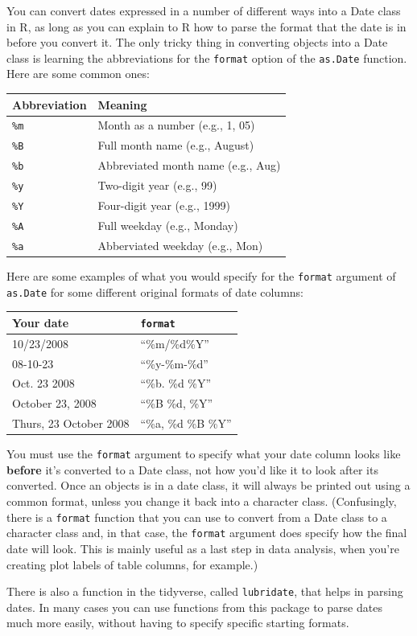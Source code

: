 \documentclass[]{book}
\makeatletter
\newenvironment{kframe}{%
\medskip{}
\setlength{\fboxsep}{.8em}
 \def\at@end@of@kframe{}%
 \ifinner\ifhmode%
  \def\at@end@of@kframe{\end{minipage}}%
  \begin{minipage}{\columnwidth}%
 \fi\fi%
 \def\FrameCommand##1{\hskip\@totalleftmargin \hskip-\fboxsep
 \colorbox{shadecolor}{##1}\hskip-\fboxsep
     \hskip-\linewidth \hskip-\@totalleftmargin \hskip\columnwidth}%
 \MakeFramed {\advance\hsize-\width
   \@totalleftmargin\z@ \linewidth\hsize
   \@setminipage}}%
 {\par\unskip\endMakeFramed%
 \at@end@of@kframe}
\newenvironment{rmdblock}[1]
  {
  \begin{itemize}
  \renewcommand{\labelitemi}{
    \raisebox{-.7\height}[0pt][0pt]{
      {\setkeys{Gin}{width=3em,keepaspectratio}\texttt{[image: images/\#1]}}
    }
  }
  \setlength{\fboxsep}{1em}
  \begin{kframe}
  \item
  }
  {
  \end{kframe}
  \end{itemize}
  }
\newenvironment{rmdwarning}
  {\begin{rmdblock}{warning}}
  {\end{rmdblock}}
\makeatother
\begin{document}
You can convert dates expressed in a number of different ways into a
Date class in R, as long as you can explain to R how to parse the format
that the date is in before you convert it. The only tricky thing in
converting objects into a Date class is learning the abbreviations for
the \texttt{format} option of the \texttt{as.Date} function. Here are
some common ones:

\begin{longtable}[c]{@{}ll@{}}
\toprule
Abbreviation & Meaning\tabularnewline
\midrule
\endhead
\texttt{\%m} & Month as a number (e.g., 1, 05)\tabularnewline
\texttt{\%B} & Full month name (e.g., August)\tabularnewline
\texttt{\%b} & Abbreviated month name (e.g., Aug)\tabularnewline
\texttt{\%y} & Two-digit year (e.g., 99)\tabularnewline
\texttt{\%Y} & Four-digit year (e.g., 1999)\tabularnewline
\texttt{\%A} & Full weekday (e.g., Monday)\tabularnewline
\texttt{\%a} & Abberviated weekday (e.g., Mon)\tabularnewline
\bottomrule
\end{longtable}

Here are some examples of what you would specify for the \texttt{format}
argument of \texttt{as.Date} for some different original formats of date
columns:

\begin{longtable}[c]{@{}ll@{}}
\toprule
Your date & \texttt{format}\tabularnewline
\midrule
\endhead
10/23/2008 & ``\%m/\%d\%Y''\tabularnewline
08-10-23 & ``\%y-\%m-\%d''\tabularnewline
Oct. 23 2008 & ``\%b. \%d \%Y''\tabularnewline
October 23, 2008 & ``\%B \%d, \%Y''\tabularnewline
Thurs, 23 October 2008 & ``\%a, \%d \%B \%Y''\tabularnewline
\bottomrule
\end{longtable}

\begin{rmdwarning}
You must use the \texttt{format} argument to specify what your date
column looks like \textbf{before} it's converted to a Date class, not
how you'd like it to look after its converted. Once an objects is in a
date class, it will always be printed out using a common format, unless
you change it back into a character class. (Confusingly, there is a
\texttt{format} function that you can use to convert from a Date class
to a character class and, in that case, the \texttt{format} argument
does specify how the final date will look. This is mainly useful as a
last step in data analysis, when you're creating plot labels of table
columns, for example.)
\end{rmdwarning}

There is also a function in the tidyverse, called \texttt{lubridate},
that helps in parsing dates. In many cases you can use functions from
this package to parse dates much more easily, without having to specify
specific starting formats.
\end{document}
